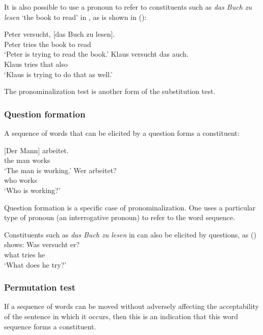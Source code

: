 \noindent
It is also possible to use a pronoun to refer to constituents such as \emph{das Buch zu lesen} `the
book to read' in , as is shown in ():

\eal
\ex 
\gll Peter versucht, [das Buch zu lesen].\\
	 Peter tries \spacebr{}the book to read\\
\glt `Peter is trying to read the book.'
\ex 
\gll Klaus versucht das auch.\\
	 Klaus tries that also\\
\glt `Klaus is trying to do that as well.'
\zl

\noindent
The pronominalization test is another form of the substitution test.

\subsubsection{Question formation}

A sequence of words that can be elicited by a question forms a constituent:

\eal
\ex 
\gll {}[Der Mann] arbeitet.\\
	 \spacebr{}the man works\\
\glt `The man is working.'
\ex 
\gll Wer arbeitet?\\
	 who works\\
\glt `Who is working?'
\zl

\noindent
Question formation is a specific case of pronominalization. One uses a particular type of pronoun (an interrogative 
pronoun) to refer to the word sequence.

Constituents such as \emph{das Buch zu lesen} in  can also be elicited by questions, as () 
shows:
\ea
\gll Was versucht er?\\
     what tries he\\
\glt `What does he try?'
\z



\subsubsection{Permutation test}

If a sequence of words can be moved without adversely affecting the acceptability of the sentence
in which it occurs, then this is an indication that this word sequence forms a constituent.


